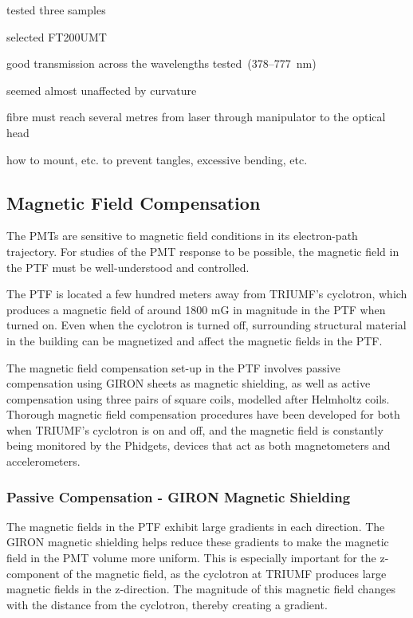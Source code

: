 tested three samples

selected FT200UMT

good transmission across the wavelengths tested~(378--777~nm)

seemed almost unaffected by curvature

fibre must reach several metres from laser through manipulator to the
optical head

how to mount, etc. to prevent tangles, excessive bending, etc.


\subsection{Magnetic Field Compensation}
\label{Sec:MagFieldCompensation}

The PMTs are sensitive to magnetic field conditions in its electron-path trajectory. For studies of the PMT response to be possible, the magnetic field in the PTF must be well-understood and controlled.

The PTF is located a few hundred meters away from TRIUMF's cyclotron, which produces a magnetic field of around 1800 mG in magnitude in the PTF when turned on. Even when the cyclotron is turned off, surrounding structural material in the building can be magnetized and affect the magnetic fields in the PTF. 

The magnetic field compensation set-up in the PTF involves passive compensation using GIRON sheets as magnetic shielding, as well as active compensation using three pairs of square coils, modelled after Helmholtz coils. Thorough magnetic field compensation procedures have been developed for both when TRIUMF's cyclotron is on and off, and the magnetic field is constantly being monitored by the Phidgets, devices that act as both magnetometers and accelerometers. 

\subsubsection{Passive Compensation - GIRON Magnetic Shielding}

The magnetic fields in the PTF exhibit large gradients in each direction. The GIRON magnetic shielding helps reduce these gradients to make the magnetic field in the PMT volume more uniform. This is especially important for the z-component of the magnetic field, as the cyclotron at TRIUMF produces large magnetic fields in the z-direction. The magnitude of this magnetic field changes with the distance from the cyclotron, thereby creating a gradient.

